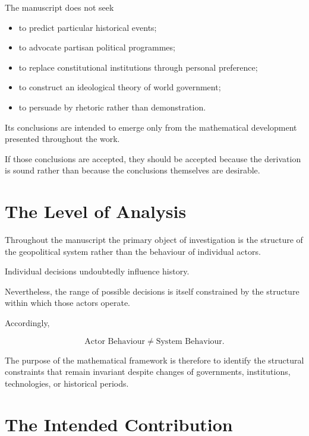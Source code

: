 \documentclass[11pt,openany]{book}
\theoremstyle{plain}
\theoremstyle{definition}
\begin{document}
The manuscript does not seek

\begin{itemize}

\item to predict particular historical events;

\item to advocate partisan political programmes;

\item to replace constitutional institutions through personal preference;

\item to construct an ideological theory of world government;

\item to persuade by rhetoric rather than demonstration.

\end{itemize}

Its conclusions are intended to emerge only from the mathematical development presented throughout the work.

If those conclusions are accepted, they should be accepted because the derivation is sound rather than because the conclusions themselves are desirable.


\section*{The Level of Analysis}

Throughout the manuscript the primary object of investigation is the structure of the geopolitical system rather than the behaviour of individual actors.

Individual decisions undoubtedly influence history.

Nevertheless, the range of possible decisions is itself constrained by the structure within which those actors operate.

Accordingly,

\[
\boxed{
\text{Actor Behaviour}
\neq
\text{System Behaviour}.
}
\]

The purpose of the mathematical framework is therefore to identify the structural constraints that remain invariant despite changes of governments, institutions, technologies, or historical periods.


\section*{The Intended Contribution}
\end{document}
